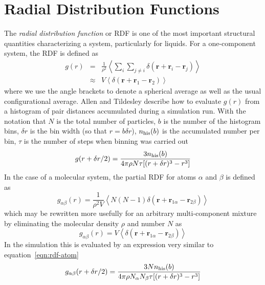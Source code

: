 \documentclass[a4paper,twoside]{report}
\newcommand{\bm}[1]{\mathbf{#1}}
\begin{document}
\section{Radial Distribution Functions}%
\label{sec:rdf}
The \emph{radial distribution function} or RDF is one of the most
important structural quantities characterizing a system, particularly
for liquids.  For a one-component system, the RDF is defined
as\cite[p445]{hansen:86}
\begin{eqnarray}
g(r) & = & \frac{1}{\rho^2} \left < \sum_i \sum_{j\neq i}
\delta(\bm{r} + \bm{r}_i - \bm{r}_j) \right > \\ \nonumber
 &  \approx  & V \left < \delta(\bm{r} + \bm{r}_1 - \bm{r}_2) \right >
\end{eqnarray}
where we use the angle brackets to denote a spherical average as well
as the usual configurational average.  Allen and
Tildesley\cite[pp184,185]{allen:87} describe how to evaluate $g(r)$
from a histogram of pair distances accumulated during a simulation
run. With the notation that $N$ is the total number of particles, $b$
is the number of the histogram bins, $\delta r$ is the bin width (so
that $r = b \delta r$), $n_{\textnormal{his}}(b)$ is the accumulated
number per bin, $\tau$ is the number of steps when binning was carried
out
\begin{equation}
\label{eqn:rdf-atom}
g(r + \delta r/2) = \frac{3 n_{\textnormal{his}}(b)}{4 \pi \rho N \tau
  [(r + \delta r)^3 - r^3]} 
\end{equation}
In the case of a molecular system, the partial RDF for atoms
$\alpha$ and $\beta$ is defined as\cite[p 445]{hansen:86}
\begin{equation}
g_{\alpha \beta}(r) = \frac{1}{\rho^2 V} \left < N(N-1)\delta(\bm{r} +
  \bm{r}_{1\alpha} - \bm{r}_{2\beta}) \right > 
\end{equation}
which may be rewritten more usefully for an arbitrary multi-component
mixture by eliminating the molecular density $\rho$ and number $N$ as
\begin{equation}
g_{\alpha \beta}(r) = V \left < \delta(\bm{r} +  \bm{r}_{1\alpha} -
  \bm{r}_{2\beta}) \right > 
\end{equation}
In the simulation this is evaluated by an expression very similar to
equation~\ref{eqn:rdf-atom}
\begin{equation}
\label{eqn:rdf-site}
g_{\alpha \beta}(r + \delta r/2) = \frac{3 N n_{\textnormal{his}}(b)}{4 \pi
\rho N_\alpha N_\beta \tau [(r + \delta r)^3 - r^3]}
\end{equation}
\end{document}

